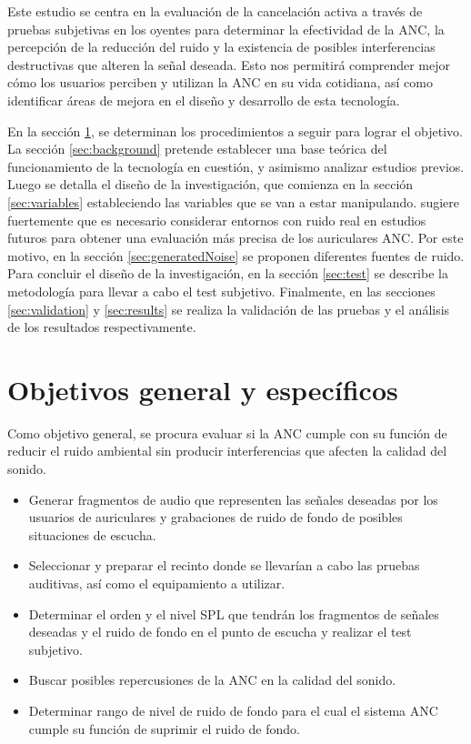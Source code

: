 \documentclass[a4paper,12pt]{article}
\begin{document}
Este estudio se centra en la evaluación de la cancelación activa a través de pruebas subjetivas en los oyentes para determinar la efectividad de la ANC, la percepción de la reducción del ruido y la existencia de posibles interferencias destructivas que alteren la señal deseada.
Esto nos permitirá comprender mejor cómo los usuarios perciben y utilizan la ANC en su vida cotidiana, así como identificar áreas de mejora en el diseño y desarrollo de esta tecnología.

En la sección \ref{sec:objectives}, se determinan los procedimientos a seguir para lograr el objetivo.
La sección \ref{sec:background} pretende establecer una base teórica del funcionamiento de la tecnología en cuestión, y asimismo analizar estudios previos.
Luego se detalla el diseño de la investigación, que comienza en la sección \ref{sec:variables} estableciendo las variables que se van a estar manipulando.
\textcite{Ang2017} sugiere fuertemente que es necesario considerar entornos con ruido real en estudios futuros para obtener una evaluación más precisa de los auriculares ANC.
Por este motivo, en la sección \ref{sec:generatedNoise} se proponen diferentes fuentes de ruido.
Para concluir el diseño de la investigación, en la sección \ref{sec:test} se describe la metodología para llevar a cabo el test subjetivo.
Finalmente, en las secciones \ref{sec:validation} y \ref{sec:results} se realiza la validación de las pruebas y el análisis de los resultados respectivamente.

\section{Objetivos general y específicos}
\label{sec:objectives}

Como objetivo general, se procura evaluar si la ANC cumple con su función de reducir el ruido ambiental sin producir interferencias que afecten la calidad del sonido.


\begin{itemize}[label=\textbullet]
    \item Generar fragmentos de audio que representen las señales deseadas por los usuarios de auriculares y grabaciones de ruido de fondo de posibles situaciones de escucha.

    \item Seleccionar y preparar el recinto donde se llevarían a cabo las pruebas auditivas, así como el equipamiento a utilizar.

    \item Determinar el orden y el nivel SPL que tendrán los fragmentos de señales deseadas y el ruido de fondo en el punto de escucha y realizar el test subjetivo.

    \item Buscar posibles repercusiones de la ANC en la calidad del sonido.

    \item Determinar rango de nivel de ruido de fondo para el cual el sistema ANC cumple su función de suprimir el ruido de fondo.
\end{itemize}
\end{document}
